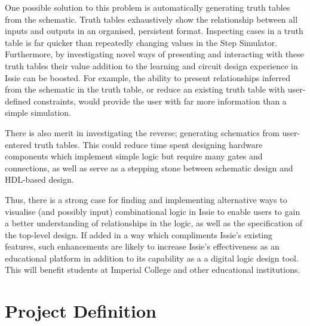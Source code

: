 One possible solution to this problem is automatically generating truth tables from the schematic. Truth tables exhaustively show the relationship between all inputs and outputs in an organised, persistent format. Inspecting cases in a truth table is far quicker than repeatedly changing values in the Step Simulator.
Furthermore, by investigating novel ways of presenting and interacting with these truth tables their value addition to the learning and circuit design experience in Issie can be boosted. For example, the ability to  present relationships inferred from the schematic in the truth table, or reduce an existing truth table with user-defined constraints, would provide the user with far more information than a simple simulation.

There is also merit in investigating the reverse; generating schematics from user-entered truth tables. This could reduce time spent designing hardware components which implement simple logic but require many gates and connections, as well as serve as a stepping stone between schematic design and HDL-based design.

Thus, there is a strong case for finding and implementing alternative ways to visualise (and possibly input) combinational logic in Issie to enable users to gain a better understanding of relationships in the logic, as well as the specification of the top-level design. If added in a way which compliments Issie's existing features, such enhancements are likely to increase Issie's effectiveness as an educational platform in addition to its capability as a a digital logic design tool.
This will benefit students at Imperial College and other educational institutions.

\section{Project Definition}

